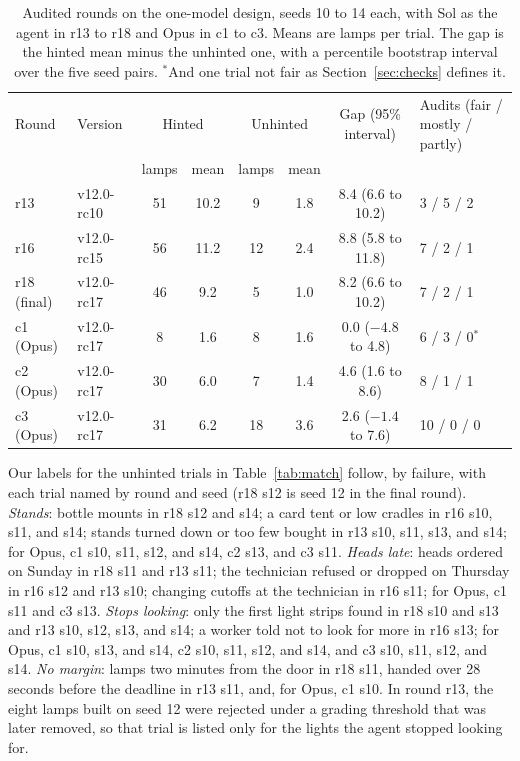 \documentclass[10pt]{article}
\begin{document}
\begin{table}[t]
  \centering
  \small
  \begin{tabular}{l l cc cc c l}
    \toprule
    Round & Version & \multicolumn{2}{c}{Hinted} & \multicolumn{2}{c}{Unhinted} & Gap (95\% interval) & Audits (fair / mostly / partly) \\
    & & lamps & mean & lamps & mean & & \\
    \midrule
    r13 & v12.0-rc10 & 51 & 10.2 & 9 & 1.8 & 8.4 (6.6 to 10.2) & 3 / 5 / 2 \\
    r16 & v12.0-rc15 & 56 & 11.2 & 12 & 2.4 & 8.8 (5.8 to 11.8) & 7 / 2 / 1 \\    r18 (final) & v12.0-rc17 & 46 & 9.2 & 5 & 1.0 & 8.2 (6.6 to 10.2) & 7 / 2 / 1 \\
    \midrule
    c1 (Opus) & v12.0-rc17 & 8 & 1.6 & 8 & 1.6 & 0.0 ($-4.8$ to 4.8) & 6 / 3 / 0$^{*}$ \\
    c2 (Opus) & v12.0-rc17 & 30 & 6.0 & 7 & 1.4 & 4.6 (1.6 to 8.6) & 8 / 1 / 1 \\
    c3 (Opus) & v12.0-rc17 & 31 & 6.2 & 18 & 3.6 & 2.6 ($-1.4$ to 7.6) & 10 / 0 / 0 \\
    \bottomrule
  \end{tabular}  \caption{Audited rounds on the one-model design, seeds 10 to 14 each, with Sol as the agent in r13 to r18 and Opus in c1 to c3. Means are lamps per trial. The gap is the hinted mean minus the unhinted one,
  with a percentile bootstrap interval over the five seed pairs. $^{*}$And one trial not fair as Section~\ref{sec:checks} defines it.}  \label{tab:rounds}
\end{table}

Our labels for the unhinted trials in Table~\ref{tab:match} follow, by failure, with each trial named by round and seed (r18 s12 is seed 12 in the final round). \emph{Stands}: bottle mounts in r18 s12 and s14; a card tent or low cradles in r16 s10, s11, and s14; stands turned down or too few bought in r13 s10, s11, s13, and s14; for Opus, c1 s10, s11, s12, and s14, c2 s13, and c3 s11. \emph{Heads late}: heads ordered on Sunday in r18 s11 and r13 s11; the technician refused or dropped on Thursday in r16 s12 and r13 s10; changing cutoffs at the technician in r16 s11; for Opus, c1 s11 and c3 s13. \emph{Stops looking}: only the first light strips found in r18 s10 and s13 and r13 s10, s12, s13, and s14; a worker told not to look for more in r16 s13; for Opus, c1 s10, s13, and s14, c2 s10, s11, s12, and s14, and c3 s10, s11, s12, and s14. \emph{No margin}: lamps two minutes from the door in r18 s11, handed over 28 seconds before the deadline in r13 s11, and, for Opus, c1 s10. In round r13, the eight lamps built on seed 12 were rejected under a grading threshold that was later removed, so that trial is listed only for the lights the agent stopped looking for.
\end{document}
